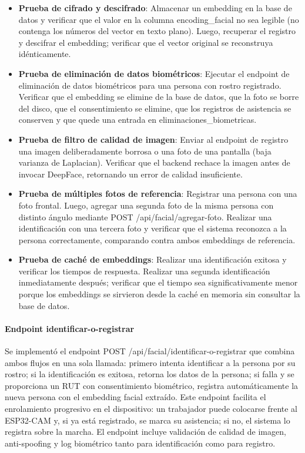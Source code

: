 \begin{itemize}
    \item \textbf{Prueba de cifrado y descifrado}: Almacenar un embedding en la base de datos y verificar que el valor en la columna encoding\_facial no sea legible (no contenga los números del vector en texto plano). Luego, recuperar el registro y descifrar el embedding; verificar que el vector original se reconstruya idénticamente.

    \item \textbf{Prueba de eliminación de datos biométricos}: Ejecutar el endpoint de eliminación de datos biométricos para una persona con rostro registrado. Verificar que el embedding se elimine de la base de datos, que la foto se borre del disco, que el consentimiento se elimine, que los registros de asistencia se conserven y que quede una entrada en eliminaciones\_biometricas.

    \item \textbf{Prueba de filtro de calidad de imagen}: Enviar al endpoint de registro una imagen deliberadamente borrosa o una foto de una pantalla (baja varianza de Laplacian). Verificar que el backend rechace la imagen antes de invocar DeepFace, retornando un error de calidad insuficiente.

    \item \textbf{Prueba de múltiples fotos de referencia}: Registrar una persona con una foto frontal. Luego, agregar una segunda foto de la misma persona con distinto ángulo mediante POST /api/facial/agregar-foto. Realizar una identificación con una tercera foto y verificar que el sistema reconozca a la persona correctamente, comparando contra ambos embeddings de referencia.
    
    \item \textbf{Prueba de caché de embeddings}: Realizar una identificación exitosa y verificar los tiempos de respuesta. Realizar una segunda identificación inmediatamente después; verificar que el tiempo sea significativamente menor porque los embeddings se sirvieron desde la caché en memoria sin consultar la base de datos.
\end{itemize}

\paragraph{Endpoint identificar-o-registrar}

Se implementó el endpoint POST /api/facial/identificar-o-registrar que combina ambos flujos en una sola llamada: primero intenta identificar a la persona por su rostro; si la identificación es exitosa, retorna los datos de la persona; si falla y se proporciona un RUT con consentimiento biométrico, registra automáticamente la nueva persona con el embedding facial extraído. Este endpoint facilita el enrolamiento progresivo en el dispositivo: un trabajador puede colocarse frente al ESP32-CAM y, si ya está registrado, se marca su asistencia; si no, el sistema lo registra sobre la marcha. El endpoint incluye validación de calidad de imagen, anti-spoofing y log biométrico tanto para identificación como para registro.

